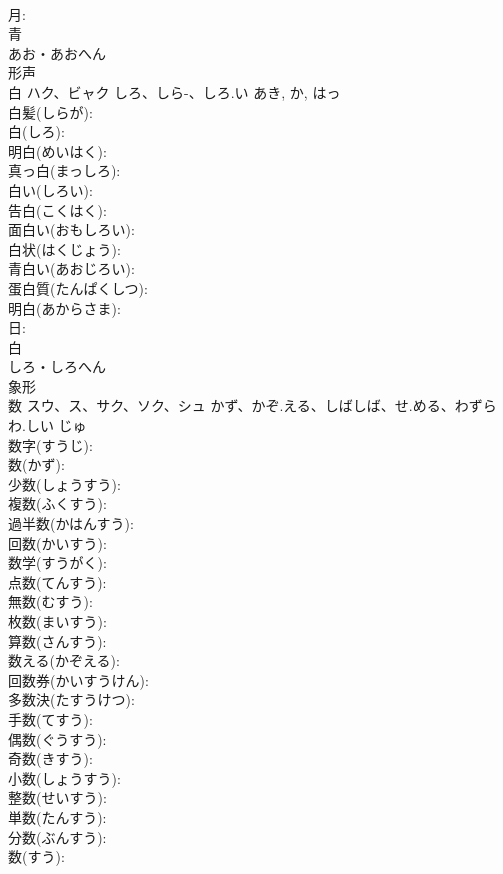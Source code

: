 \documentclass[8pt]{extreport}
\begin{document}
\begin{CJK}{UTF8}{min}
\\	月: 
\\	青	
\\	あお・あおへん	
\\	形声 
\\	白	ハク、ビャク	しろ、しら-、しろ.い	あき, か, はっ	
\\	白髪(しらが): 
\\	白(しろ): 
\\	明白(めいはく): 
\\	真っ白(まっしろ): 
\\	白い(しろい): 
\\	告白(こくはく): 
\\	面白い(おもしろい): 
\\	白状(はくじょう): 
\\	青白い(あおじろい): 
\\	蛋白質(たんぱくしつ): 
\\	明白(あからさま): 
\\	日: 
\\	白	
\\	しろ・しろへん	
\\	象形 
\\	数	スウ、ス、サク、ソク、シュ	かず、かぞ.える、しばしば、せ.める、わずらわ.しい	じゅ	
\\	数字(すうじ): 
\\	数(かず): 
\\	少数(しょうすう): 
\\	複数(ふくすう): 
\\	過半数(かはんすう): 
\\	回数(かいすう): 
\\	数学(すうがく): 
\\	点数(てんすう): 
\\	無数(むすう): 
\\	枚数(まいすう): 
\\	算数(さんすう): 
\\	数える(かぞえる): 
\\	回数券(かいすうけん): 
\\	多数決(たすうけつ): 
\\	手数(てすう): 
\\	偶数(ぐうすう): 
\\	奇数(きすう): 
\\	小数(しょうすう): 
\\	整数(せいすう): 
\\	単数(たんすう): 
\\	分数(ぶんすう): 
\\	数(すう): 

\end{CJK}
\end{document}
